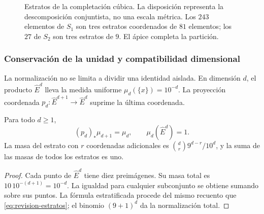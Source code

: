 \begin{figure}[htbp]
\centering
{}
\caption{Estratos de la completación cúbica. La disposición representa
la descomposición conjuntista, no una escala métrica. Los \(243\) elementos
de \(S_1\) son tres estratos coordenados de \(81\) elementos; los \(27\)
de \(S_2\) son tres estratos de \(9\). El ápice completa la partición.}
\label{fig:revision-emrh}
\end{figure}



\subsubsection{Conservación de la unidad y compatibilidad dimensional}

La normalización no se limita a dividir una identidad aislada. En dimensión
\(d\), el producto \(\widehat E^d\) lleva la medida uniforme
\(\mu_d(\{x\})=10^{-d}\). La proyección coordenada
\(p_d:\widehat E^{d+1}\to\widehat E^d\) suprime la última coordenada.

\begin{proposition}
Para todo \(d\geq1\),
\[
 (p_d)_*\mu_{d+1}=\mu_d,
 \qquad \mu_d(\widehat E^d)=1.
\]
La masa del estrato con \(r\) coordenadas adicionales es
\(\binom dr9^{d-r}/10^d\), y la suma de las masas de todos los estratos
es uno.
\end{proposition}
\begin{proof}
Cada punto de \(\widehat E^d\) tiene diez preimágenes. Su masa total es
\(10\,10^{-(d+1)}=10^{-d}\). La igualdad para cualquier subconjunto
se obtiene sumando sobre sus puntos. La fórmula estratificada procede
del mismo recuento que \eqref{eq:revision-estratos}; el binomio
\((9+1)^d\) da la normalización total.
\end{proof}


